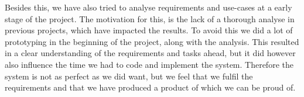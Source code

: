 Besides this, we have also tried to analyse requirements and use-cases at a early stage of the project. The motivation for this, is the lack of a thorough analyse in previous projects, which have impacted the results. To avoid this we did a lot of prototyping in the beginning of the project, along with the analysis. This resulted in a clear understanding of the requirements and tasks ahead, but it did however also influence the time we had to code and implement the system. Therefore the system is not as perfect as we did want, but we feel that we fulfil the requirements and that we have produced a product of which we can be proud of.






 